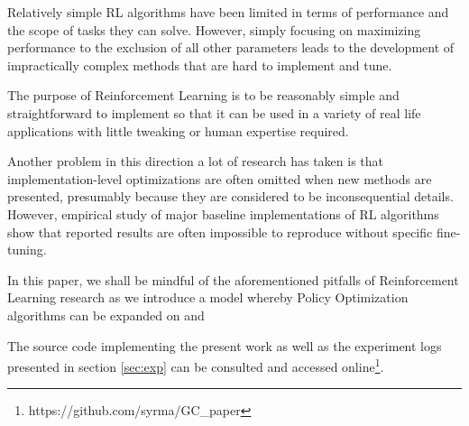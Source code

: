 Relatively simple RL algorithms have been limited in terms of performance and the scope of tasks they can solve. However, simply focusing on maximizing performance to the exclusion of all other parameters leads to the development of impractically complex methods that are hard to implement and tune.%

The purpose of Reinforcement Learning is to be reasonably simple and straightforward to implement so that it can be used in a variety of real life applications with little tweaking or human expertise required.

Another problem in this direction a lot of research has taken is that implementation-level optimizations are often omitted when new methods are presented, presumably because they are considered to be inconsequential details. However, empirical study of  major baseline implementations of RL algorithms show that reported results are often impossible to reproduce without specific fine-tuning\cite{henderson2018deep}\cite{islam2017reproducibility}\cite{andrychowicz2021matters}\cite{dossa2021empirical}.


In this paper, we shall be mindful of the aforementioned pitfalls of Reinforcement Learning research as we introduce a model whereby Policy Optimization algorithms can be expanded on and 



The source code implementing the present work as well as the experiment logs presented in section \ref{sec:exp} can be consulted and accessed online\footnote{https://github.com/syrma/GC\_paper}.
